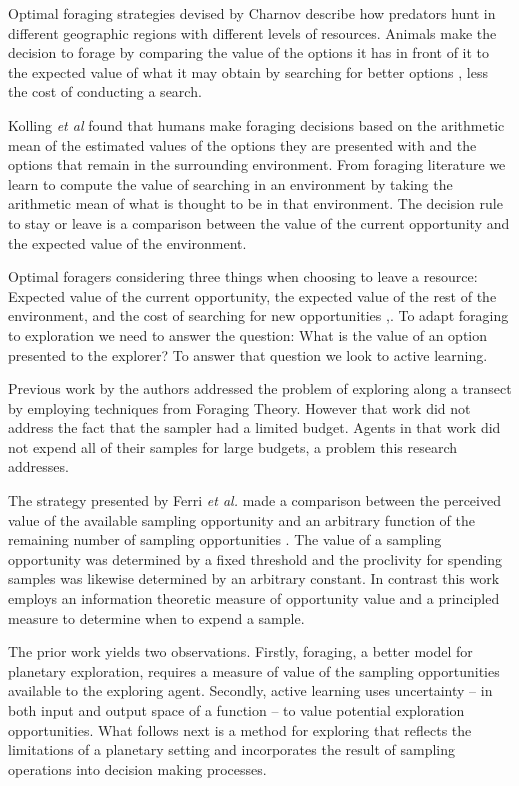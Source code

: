 Optimal foraging strategies devised by Charnov \cite{charnov1976optimal}
describe how predators hunt in different geographic regions with different
levels of resources.  Animals make the decision to forage by comparing the
value of the options it has in front of it to the expected value of what it may
obtain by searching for better options \cite{kolling2012neural}, less the cost
of conducting a search.  

Kolling \emph{et al} \cite{kolling2012neural} found that humans make foraging
decisions based on the arithmetic mean of the estimated values of the options
they are presented with and the options that remain in the surrounding
environment.  From foraging literature we learn to compute the value of
searching in an environment by taking the arithmetic mean of what is thought to
be in that environment.  The decision rule to stay or leave is a comparison
between the value of the current opportunity and the expected value of the
environment.

Optimal foragers considering three things when choosing to leave a resource:
Expected value of the current opportunity, the expected value of the rest of
the environment, and the cost of searching for new opportunities
\cite{charnov1976optimal},\cite{kolling2012neural}.  To adapt foraging to
exploration we need to answer the question: What is the value of
an option presented to the explorer?  To answer that question we look to active
learning.

Previous work by the authors \cite{furlong2014sequential} addressed the problem of exploring along a transect by employing techniques from Foraging Theory. However that work did not address the fact that the sampler had a limited budget.  Agents in that work did not expend all of their samples for large budgets, a problem this research addresses.

The strategy presented by Ferri \emph{et al.} made a comparison between the
perceived value of the available sampling opportunity and an arbitrary function
of the remaining number of sampling opportunities \cite{ferri2010novel}.  The
value of a sampling opportunity was determined by a fixed threshold and the
proclivity for spending samples was likewise determined by an arbitrary
constant.  In contrast this work employs an information theoretic measure of opportunity value and a principled measure to determine when to expend a sample. 



The prior work yields two observations.  Firstly, foraging, a better model for
planetary exploration, requires a measure of value of the sampling
opportunities available to the exploring agent.  Secondly, active learning uses
uncertainty -- in both input and output space of a function -- to value
potential exploration opportunities.  What follows next is a method for
exploring that reflects the limitations of a planetary setting and incorporates
the result of sampling operations into decision making processes.
